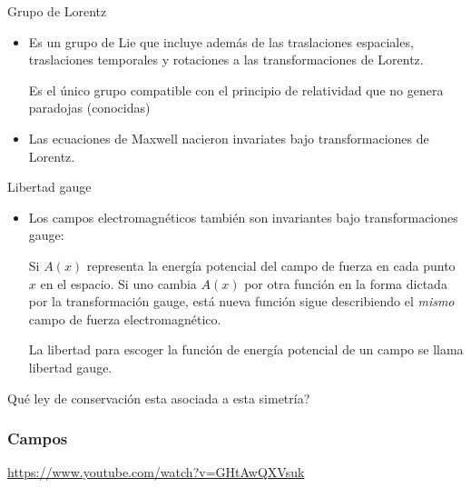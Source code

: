 \documentclass[%
xcolor=pdftex,dvipsnames,table%
]{beamer}
\begin{document}
\begin{frame}[plain]
  \begin{block}{Grupo de Lorentz}
    \begin{itemize}
    \item     Es un grupo de Lie que incluye además de las traslaciones espaciales, traslaciones temporales y rotaciones a  las transformaciones de Lorentz. 

Es el único grupo compatible con el principio de relatividad que no genera paradojas (conocidas)


\item Las ecuaciones de Maxwell nacieron invariates bajo transformaciones de Lorentz.
  
\end{itemize}
  \end{block}
  \begin{block}{Libertad gauge}
\begin{itemize}
\item Los campos electromagnéticos también son invariantes bajo transformaciones gauge:

Si $A(x)$ representa la energía potencial del campo de fuerza en cada punto $x$ en el espacio. Si uno cambia $A(x)$ por otra función en la forma dictada por la transformación gauge, está nueva función sigue describiendo el \emph{mismo} campo de fuerza electromagnético. 

La libertad para escoger la función de energía potencial de un campo se llama libertad gauge.

    \end{itemize}
Qué ley de conservación esta asociada a esta simetría?
  \end{block}
\end{frame}

\begin{frame}
  \frametitle{Campos}
  \url{https://www.youtube.com/watch?v=GHtAwQXVsuk}
\end{frame}
\end{document}
